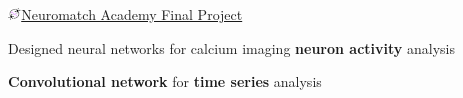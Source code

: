 \begin{cventries}
  \cventry
    {}
    {\includegraphics[width=3.5mm]{snippy-nma.png}\acvHeaderIconSep\href{https://portal.neuromatchacademy.org/certificate/a6398835-adc9-4528-99d6-347675c05ffd}{Neuromatch Academy Final Project}}
    {}
    {}
    {
      \begin{cvitems}
        \item {Designed neural networks for calcium imaging \textbf{neuron activity} analysis}
        \item {\textbf{Convolutional network} for \textbf{time series} analysis}
      \end{cvitems}
    }

\end{cventries}
